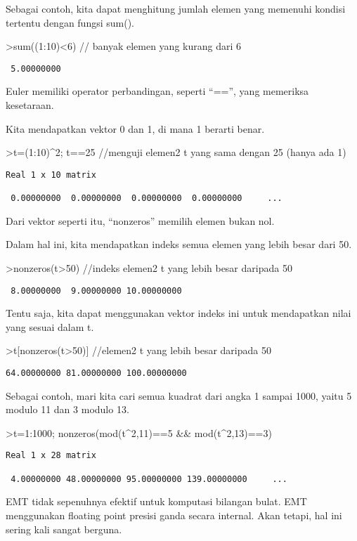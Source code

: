 \documentclass[
]{book}
\begin{document}
Sebagai contoh, kita dapat menghitung jumlah elemen yang memenuhi kondisi tertentu dengan fungsi sum().

\textgreater sum((1:10)\textless6) // banyak elemen yang kurang dari 6

\begin{verbatim}
 5.00000000 
\end{verbatim}

Euler memiliki operator perbandingan, seperti ``=='', yang memeriksa kesetaraan.

Kita mendapatkan vektor 0 dan 1, di mana 1 berarti benar.

\textgreater t=(1:10)\^{}2; t==25 //menguji elemen2 t yang sama dengan 25 (hanya ada 1)

\begin{verbatim}
Real 1 x 10 matrix

 0.00000000  0.00000000  0.00000000  0.00000000     ...
\end{verbatim}

Dari vektor seperti itu, ``nonzeros'' memilih elemen bukan nol.

Dalam hal ini, kita mendapatkan indeks semua elemen yang lebih besar dari 50.

\textgreater nonzeros(t\textgreater50) //indeks elemen2 t yang lebih besar daripada 50

\begin{verbatim}
 8.00000000  9.00000000 10.00000000 
\end{verbatim}

Tentu saja, kita dapat menggunakan vektor indeks ini untuk mendapatkan nilai yang sesuai dalam t.

\textgreater t{[}nonzeros(t\textgreater50){]} //elemen2 t yang lebih besar daripada 50

\begin{verbatim}
64.00000000 81.00000000 100.00000000 
\end{verbatim}

Sebagai contoh, mari kita cari semua kuadrat dari angka 1 sampai 1000, yaitu 5 modulo 11 dan 3 modulo 13.

\textgreater t=1:1000; nonzeros(mod(t\^{}2,11)==5 \&\& mod(t\^{}2,13)==3)

\begin{verbatim}
Real 1 x 28 matrix

 4.00000000 48.00000000 95.00000000 139.00000000     ...
\end{verbatim}

EMT tidak sepenuhnya efektif untuk komputasi bilangan bulat. EMT menggunakan floating point presisi ganda secara internal. Akan tetapi, hal ini sering kali sangat berguna.
\end{document}
